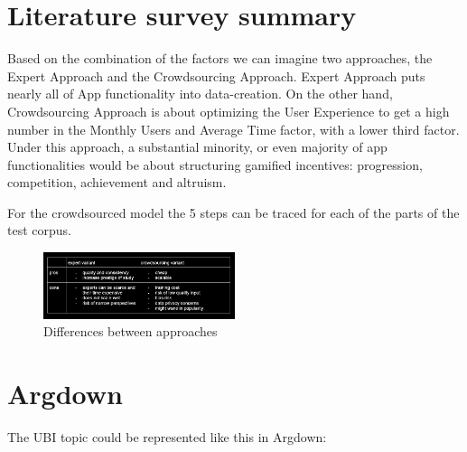 \documentclass{report}
\begin{document}
\section{Literature survey summary}

Based on the combination of the factors we can imagine two approaches, the Expert Approach and the Crowdsourcing Approach.  Expert Approach puts nearly all of App functionality into data-creation. 
On the other hand, Crowdsourcing Approach is about optimizing the User Experience to get a high number in the Monthly Users and Average Time factor, with a lower third factor.  Under this approach, a substantial minority, or even majority of app functionalities would be about structuring gamified incentives: progression, competition, achievement and altruism.

For the crowdsourced model the 5 steps can be traced for each of the parts of the test corpus. 
\begin{figure}[h]
    \centering
    \includegraphics[width=0.5\textwidth]{./images/experts-vs-crowdsource.png}
    \caption{Differences between approaches}
    \label{fig:example}
\end{figure}


\section{Argdown}

The UBI topic could be represented like this in Argdown:
\end{document}
